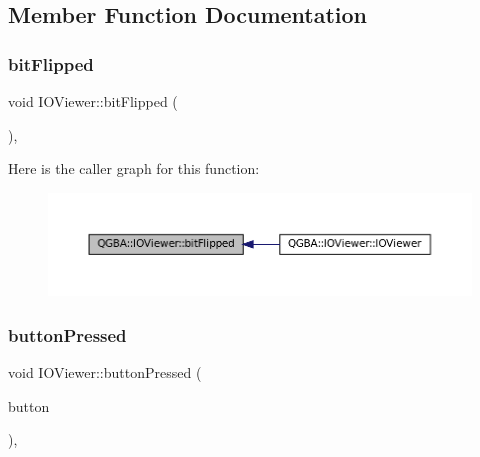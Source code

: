 \subsection{Member Function Documentation}
\mbox{\label{class_q_g_b_a_1_1_i_o_viewer_a811aa6b971d86f1ef93536ab80c811f0}} 
\subsubsection{\texorpdfstring{bit\+Flipped}{bitFlipped}}
{\footnotesize\ttfamily void I\+O\+Viewer\+::bit\+Flipped (\begin{DoxyParamCaption}{ }\end{DoxyParamCaption})\hspace{0.3cm}{\ttfamily [private]}, {\ttfamily [slot]}}

Here is the caller graph for this function\+:
\nopagebreak
\begin{figure}[H]
\begin{center}
\leavevmode
\includegraphics[width=350pt]{class_q_g_b_a_1_1_i_o_viewer_a811aa6b971d86f1ef93536ab80c811f0_icgraph}
\end{center}
\end{figure}
\mbox{\label{class_q_g_b_a_1_1_i_o_viewer_a2ec5269b69bdbdf23c195fdb76a91be9}} 
\subsubsection{\texorpdfstring{button\+Pressed}{buttonPressed}}
{\footnotesize\ttfamily void I\+O\+Viewer\+::button\+Pressed (\begin{DoxyParamCaption}\item[{Q\+Abstract\+Button $\ast$}]{button }\end{DoxyParamCaption})\hspace{0.3cm}{\ttfamily [private]}, {\ttfamily [slot]}}

